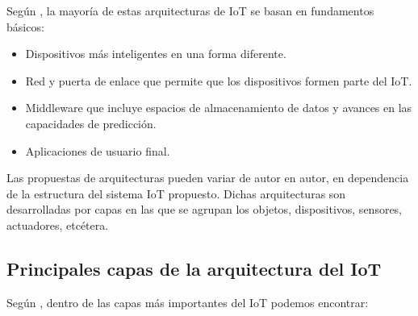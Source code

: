     Según \cite{capasIoTciberseguridad}, la mayoría de estas arquitecturas de IoT se basan en fundamentos básicos:
    \begin{itemize}
        \item Dispositivos más inteligentes en una forma diferente.
        \item Red y puerta de enlace que permite que los dispositivos formen parte del IoT.
        \item Middleware que incluye espacios de almacenamiento de datos y avances en las capacidades de predicción.
        \item Aplicaciones de usuario final.
    \end{itemize}

    Las propuestas de arquitecturas pueden variar de autor en autor, en dependencia de la estructura del sistema IoT propuesto. Dichas arquitecturas son desarrolladas por capas en las que se agrupan los objetos, dispositivos, sensores, actuadores, etcétera.

    \subsection{Principales capas de la arquitectura del IoT}

    Según  \cite{internetOfThingsStateOfTheArt}, dentro de las capas más importantes del IoT podemos encontrar:

